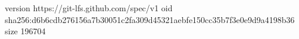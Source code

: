 version https://git-lfs.github.com/spec/v1
oid sha256:d6b6cdb276156a7b30051c2fa309d45321aebfe150cc35b7f3e0e9d9a4198b36
size 196704
